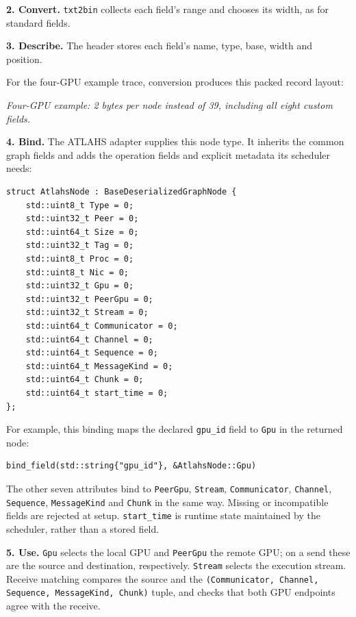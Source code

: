 \documentclass[10pt,a4paper]{article}
\begin{document}
\textbf{2. Convert.} \texttt{txt2bin} collects each field's range and chooses its width, as for standard fields.

\textbf{3. Describe.} The header stores each field's name, type, base, width and position.

For the four-GPU example trace, conversion produces this packed record layout:

\begin{center}
\resizebox{\linewidth}{!}{}
\par\nopagebreak\small\itshape Four-GPU example: 2 bytes per node instead of 39, including all eight custom fields.
\end{center}

\textbf{4. Bind.} The ATLAHS adapter supplies this node type. It inherits the common graph fields and adds the operation fields and explicit metadata its scheduler needs:

\begin{lstlisting}
struct AtlahsNode : BaseDeserializedGraphNode {
    std::uint8_t Type = 0;
    std::uint32_t Peer = 0;
    std::uint64_t Size = 0;
    std::uint32_t Tag = 0;
    std::uint8_t Proc = 0;
    std::uint8_t Nic = 0;
    std::uint32_t Gpu = 0;
    std::uint32_t PeerGpu = 0;
    std::uint32_t Stream = 0;
    std::uint64_t Communicator = 0;
    std::uint64_t Channel = 0;
    std::uint64_t Sequence = 0;
    std::uint64_t MessageKind = 0;
    std::uint64_t Chunk = 0;
    std::uint64_t start_time = 0;
};
\end{lstlisting}

For example, this binding maps the declared \texttt{gpu\_\allowbreak{}id} field to \texttt{Gpu} in the returned node:

\begin{lstlisting}
bind_field(std::string{"gpu_id"}, &AtlahsNode::Gpu)
\end{lstlisting}

The other seven attributes bind to \texttt{PeerGpu}, \texttt{Stream}, \texttt{Communicator\allowbreak{}}, \texttt{Channel}, \texttt{Sequence}, \texttt{MessageKind} and \texttt{Chunk} in the same way. Missing or incompatible fields are rejected at setup. \texttt{start\_\allowbreak{}time} is runtime state maintained by the scheduler, rather than a stored field.

\textbf{5. Use.} \texttt{Gpu} selects the local GPU and \texttt{PeerGpu} the remote GPU; on a send these are the source and destination, respectively. \texttt{Stream} selects the execution stream. Receive matching compares the source and the \texttt{(Communicato\allowbreak{}r, Channel, \allowbreak{}Sequence, Me\allowbreak{}ssageKind, C\allowbreak{}hunk)} tuple, and checks that both GPU endpoints agree with the receive.
\end{document}
